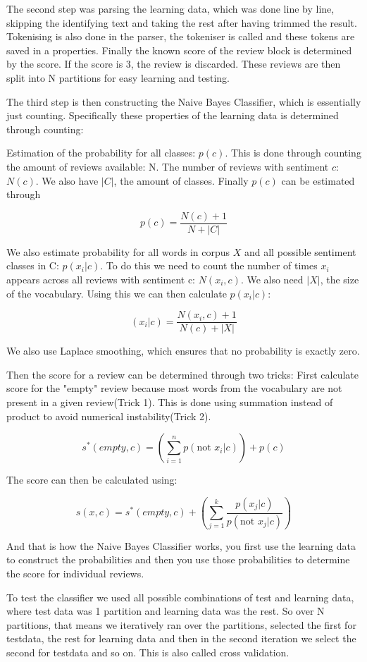 	The second step was parsing the learning data, which was done line by line, skipping the identifying text and taking the rest after having trimmed the result. Tokenising is also done in the parser, the tokeniser is called and these tokens are saved in a properties. Finally the known score of the review block is determined by the score. If the score is 3, the review is discarded. These reviews are then split into N partitions for easy learning and testing.
	
	The third step is then constructing the Naive Bayes Classifier, which is essentially just counting. Specifically these properties of the learning data is determined through counting:
	
	Estimation of the probability for all classes: $p(c)$. This is done through counting the amount of reviews available: N. The number of reviews with sentiment $c$: $N(c)$. We also have $|C|$, the amount of classes. Finally $p(c)$ can be estimated through
	
	$$p(c) = \frac{N(c) + 1}{N +|C|}$$
	
	We also estimate probability for all words in corpus $X$ and all possible sentiment classes in C: $p(x_i | c)$. 
	To do this we need to count the number of times $x_i$ appears across all reviews with sentiment c: $N(x_i, c)$. We also need $|X|$, the size of the vocabulary. Using this we can then calculate $p(x_i|c)$:
	
	$$(x_i|c) = \frac{N(x_{i}, c) + 1}{N(c) + |X|}$$
	
	We also use Laplace smoothing, which ensures that no probability is exactly zero.
	
	Then the score for a review can be determined through two tricks:
	First calculate score for the "empty" review because most words from the vocabulary are not present in a given review(Trick 1). This is done using summation instead of product to avoid numerical instability(Trick 2).
	
	$$s^{*}(empty, c) = (\sum\limits_{i=1}^{n} p(\text{not } x_i | c)) + p(c)$$
	
	The score can then be calculated using:
	
	$$s(x, c) = s^{*}(empty, c) + (\sum\limits_{j=1}^{k} \frac{p(x_{j}|c)}{p(\text{not } x_{j}|c)})$$
	
	And that is how the Naive Bayes Classifier works, you first use the learning data to construct the probabilities and then you use those probabilities to determine the score for individual reviews.
	
	To test the classifier we used all possible combinations of test and learning data, where test data was 1 partition and learning data was the rest. So over N partitions, that means we iteratively ran over the partitions, selected the first for testdata, the rest for learning data and then in the second iteration we select the second for testdata and so on. This is also called cross validation.
	
